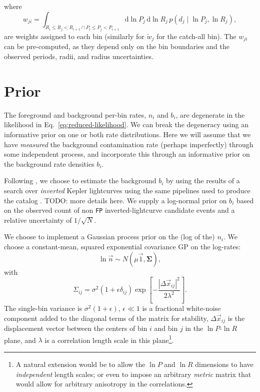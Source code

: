 \documentclass[modern]{aastex62}
\newcommand{\dd}{\mathrm{d}}
\begin{document}
%
where
%
\begin{equation}
  w_{ji} = \int_{R_i \leq R_j < R_{i+1} \cap P_i \leq P_j < P_{i+1}} \dd \ln P_j \, \dd \ln R_j \, p\left( d_j \mid \ln P_j, \ln R_j \right),
\end{equation}
%
are weights assigned to each bin (similarly for $\tilde{w}_j$ for the catch-all
bin).  The $w_{ji}$ can be pre-computed, as they depend only on the bin
boundaries and the observed periods, radii, and radius uncertainties.

\section{Prior}

The foreground and background per-bin rates, $n_i$ and $b_i$, are degenerate in
the likelihood in Eq.\ \eqref{eq:reduced-likelihood}.  We can break the
degeneracy using an informative prior on one or both rate distributions.  Here
we will assume that we have \emph{measured} the background contamination rate
(perhaps imperfectly) through some independent process, and incorporate this
through an informative prior on the background rate densities $b_i$.

Following \citet{Formean-Mackey2014}, we choose to estimate the background $b_i$
by using the results of a search over \emph{inverted} Kepler lightcurves using
the same pipelines used to produce the catalog \citep{Coughlin2017}.  TODO: more
details here.  We supply a log-normal prior on $b_i$ based on the observed count
of non \texttt{FP} inverted-lightcurve candidate events and a relative
uncertainty of $1/\sqrt{N}$.

We choose to implement a Gaussian process prior on the (log of the) $n_i$.  We
choose a constant-mean, squared exponential covariance GP on the log-rates:
%
\begin{equation}
  \ln \vec{n} \sim N\left( \mu \vec{1} , \mathbf{\Sigma} \right),
\end{equation}
%
with
%
\begin{equation}
  \Sigma_{ij} = \sigma^2 \left( 1 + \epsilon \delta_{ij} \right) \exp\left[ -\frac{\left| \Delta \vec{x}_{ij} \right|^2}{2 \lambda^2} \right].
\end{equation}
%
The single-bin variance is $\sigma^2 \left( 1 + \epsilon \right)$, $\epsilon \ll
1$ is a fractional white-noise component added to the diagonal terms of the
matrix for stability, $\Delta \vec{x}_{ij}$ is the displacement vector between
the centers of bin $i$ and bin $j$ in the $\ln P$-$\ln R$ plane, and $\lambda$
is a correlation length scale in this plane\footnote{A natural extension would
be to allow the $\ln P$ and $\ln R$ dimensions to have \emph{independent} length
scales; or even to impose an arbitrary \emph{metric} matrix that would allow for
arbitrary anisotropy in the correlations.}.
\end{document}
